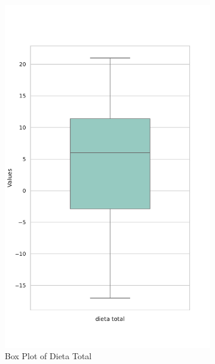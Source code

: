 \documentclass[jou]{apa7}
\begin{document}
\begin{figure}[H]
	\begin{subfigure}[b]{0.45\linewidth}
		\centering
		\includegraphics[width=\linewidth]{Box_Plot_of_dieta_total.pdf}
		\caption{Box Plot of Dieta Total}
		\label{fig:BoxPlotDietaTotal}
	\end{subfigure}
	\hfill
	\begin{subfigure}[b]{0.45\linewidth}
		\centering

\end{subfigure}
\end{figure}
\end{document}
